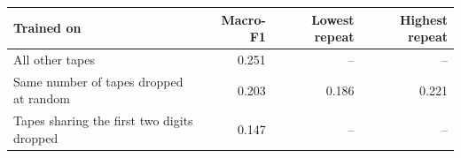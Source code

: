 \begin{tabular}{lrrr}
\toprule
Trained on & Macro-F1 & Lowest repeat & Highest repeat \\
\midrule
All other tapes & 0.251 & -- & -- \\
Same number of tapes dropped at random & 0.203 & 0.186 & 0.221 \\
Tapes sharing the first two digits dropped & 0.147 & -- & -- \\
\bottomrule
\end{tabular}
